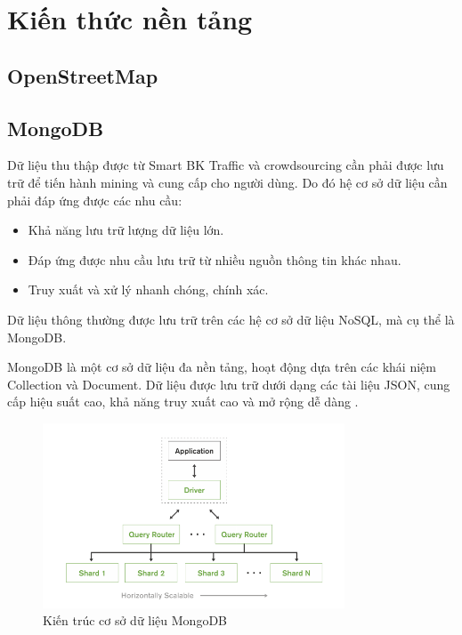 \chapter{Kiến thức nền tảng} %

\label{Chapter2}

\section{OpenStreetMap}

\section{MongoDB}
Dữ liệu thu thập được từ Smart BK Traffic và crowdsourcing cần phải được lưu trữ để tiến hành mining và cung cấp cho người dùng. Do đó hệ cơ sở dữ liệu cần phải đáp ứng được các nhu cầu:
\begin{itemize}
    \item Khả năng lưu trữ lượng dữ liệu lớn.
    \item Đáp ứng được nhu cầu lưu trữ từ nhiều nguồn thông tin khác nhau.
    \item Truy xuất và xử lý nhanh chóng, chính xác.
\end{itemize}
Dữ liệu thông thường được lưu trữ trên các hệ cơ sở dữ liệu NoSQL, mà cụ thể là MongoDB.

MongoDB là một cơ sở dữ liệu đa nền tảng, hoạt động dựa trên các khái niệm Collection và Document. Dữ liệu được lưu trữ dưới dạng các tài liệu JSON, cung cấp hiệu suất cao, khả năng truy xuất cao và mở rộng dễ dàng \cite{MongoDB1}.

\begin{figure}[H]
\centering
\includegraphics[width=0.8\textwidth]{Traffic_Report/images/image02.png}
\caption{Kiến trúc cơ sở dữ liệu MongoDB}\label{}
\end{figure}


